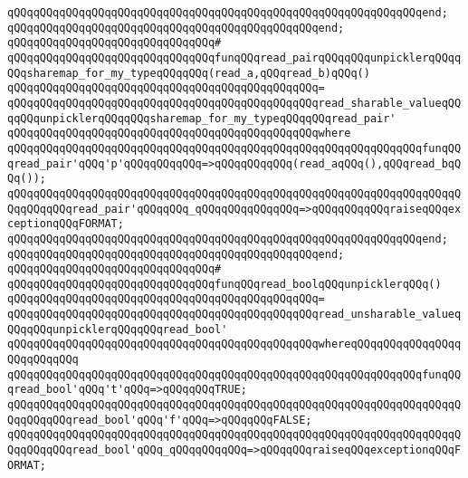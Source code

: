 \verb|qQQqqQQqqQQqqQQqqQQqqQQqqQQqqQQqqQQqqQQqqQQqqQQqqQQqqQQqqQQqqQQqend;|\newline
\verb|qQQqqQQqqQQqqQQqqQQqqQQqqQQqqQQqqQQqqQQqqQQqqQQqend;|\newline
\verb|qQQqqQQqqQQqqQQqqQQqqQQqqQQqqQQq#|\newline
\verb|qQQqqQQqqQQqqQQqqQQqqQQqqQQqqQQqfunqQQqread_pairqQQqqQQqunpicklerqQQqqQQqsharemap_for_my_typeqQQqqQQq(read_a,qQQqread_b)qQQq()|\newline
\verb|qQQqqQQqqQQqqQQqqQQqqQQqqQQqqQQqqQQqqQQqqQQqqQQq=|\newline
\verb|qQQqqQQqqQQqqQQqqQQqqQQqqQQqqQQqqQQqqQQqqQQqqQQqread_sharable_valueqQQqqQQqunpicklerqQQqqQQqsharemap_for_my_typeqQQqqQQqread_pair'|\newline
\verb|qQQqqQQqqQQqqQQqqQQqqQQqqQQqqQQqqQQqqQQqqQQqqQQqwhere|\newline
\verb|qQQqqQQqqQQqqQQqqQQqqQQqqQQqqQQqqQQqqQQqqQQqqQQqqQQqqQQqqQQqqQQqfunqQQqread_pair'qQQq'p'qQQqqQQqqQQq=>qQQqqQQqqQQq(read_aqQQq(),qQQqread_bqQQq());|\newline
\verb|qQQqqQQqqQQqqQQqqQQqqQQqqQQqqQQqqQQqqQQqqQQqqQQqqQQqqQQqqQQqqQQqqQQqqQQqqQQqqQQqread_pair'qQQqqQQq_qQQqqQQqqQQqqQQq=>qQQqqQQqqQQqraiseqQQqexceptionqQQqFORMAT;|\newline
\verb|qQQqqQQqqQQqqQQqqQQqqQQqqQQqqQQqqQQqqQQqqQQqqQQqqQQqqQQqqQQqqQQqend;|\newline
\verb|qQQqqQQqqQQqqQQqqQQqqQQqqQQqqQQqqQQqqQQqqQQqqQQqend;|\newline
\verb|qQQqqQQqqQQqqQQqqQQqqQQqqQQqqQQq#|\newline
\verb|qQQqqQQqqQQqqQQqqQQqqQQqqQQqqQQqfunqQQqread_boolqQQqunpicklerqQQq()|\newline
\verb|qQQqqQQqqQQqqQQqqQQqqQQqqQQqqQQqqQQqqQQqqQQqqQQq=|\newline
\verb|qQQqqQQqqQQqqQQqqQQqqQQqqQQqqQQqqQQqqQQqqQQqqQQqread_unsharable_valueqQQqqQQqunpicklerqQQqqQQqread_bool'|\newline
\verb|qQQqqQQqqQQqqQQqqQQqqQQqqQQqqQQqqQQqqQQqqQQqqQQqwhereqQQqqQQqqQQqqQQqqQQqqQQqqQQq|\newline
\verb|qQQqqQQqqQQqqQQqqQQqqQQqqQQqqQQqqQQqqQQqqQQqqQQqqQQqqQQqqQQqqQQqfunqQQqread_bool'qQQq't'qQQq=>qQQqqQQqTRUE;|\newline
\verb|qQQqqQQqqQQqqQQqqQQqqQQqqQQqqQQqqQQqqQQqqQQqqQQqqQQqqQQqqQQqqQQqqQQqqQQqqQQqqQQqread_bool'qQQq'f'qQQq=>qQQqqQQqFALSE;|\newline
\verb|qQQqqQQqqQQqqQQqqQQqqQQqqQQqqQQqqQQqqQQqqQQqqQQqqQQqqQQqqQQqqQQqqQQqqQQqqQQqqQQqread_bool'qQQq_qQQqqQQqqQQq=>qQQqqQQqraiseqQQqexceptionqQQqFORMAT;|\newline
